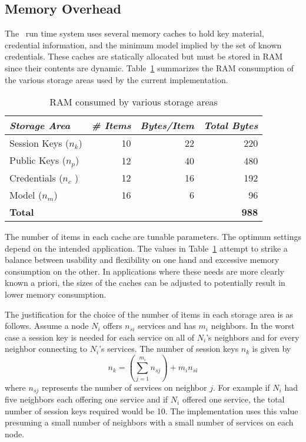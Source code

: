 \subsection{Memory Overhead}
\label{section-sprocket-memory-performance}

The \Sprocket\ run time system uses several memory caches to hold key material, credential
information, and the minimum model implied by the set of known credentials. These caches are
statically allocated but must be stored in RAM since their contents are dynamic.
Table~\ref{table-ram-consumed} summarizes the RAM consumption of the various storage areas used
by the current implementation.

\begin{table}[!t]
  \newcommand\T{\rule{0pt}{2.1ex}}
  \centering
  \caption{RAM consumed by various storage areas}
  {
  \begin{tabular}{|l|r|r|r|} \hline
    \textit{Storage Area} \T & \textit{\# Items} & \textit{Bytes/Item} & \textit{Total Bytes} \\
    \hline \hline

    Session Keys ($n_k$) \T & 10 & 22 & 220 \\ \hline 
    Public Keys ($n_p$)  \T & 12 & 40 & 480 \\ \hline
    Credentials ($n_c$ ) \T & 12 & 16 & 192 \\ \hline
    Model ($n_m$)        \T & 16 &  6 &  96 \\ \hline \hline
    \textbf{Total} \T & \multicolumn{3}{r|}{ \textbf{988} } \\ \hline
  \end{tabular}
  }
  \label{table-ram-consumed}
\end{table}

The number of items in each cache are tunable parameters. The optimum settings depend on the
intended application. The values in Table~\ref{table-ram-consumed} attempt to strike a balance
between usability and flexibility on one hand and excessive memory consumption on the other. In
applications where these needs are more clearly known a priori, the sizes of the caches can be
adjusted to potentially result in lower memory consumption.


The justification for the choice of the number of items in each storage area is as follows.
Assume a node $N_i$ offers $n_{si}$ services and has $m_i$ neighbors. In the worst case a
session key is needed for each service on all of $N_i$'s neighbors and for every neighbor
connecting to $N_i$'s services. The number of session keys $n_k$ is given by
\begin{displaymath}
n_k = \left(\sum_{j = 1}^{m_i} n_{sj}\right) + m_i n_{si}
\end{displaymath}
where $n_{sj}$ represents the number of services on neighbor $j$. For example if $N_i$ had five
neighbors each offering one service and if $N_i$ offered one service, the total number of
session keys required would be 10. The implementation uses this value presuming a small
number of neighbors with a small number of services on each node.

